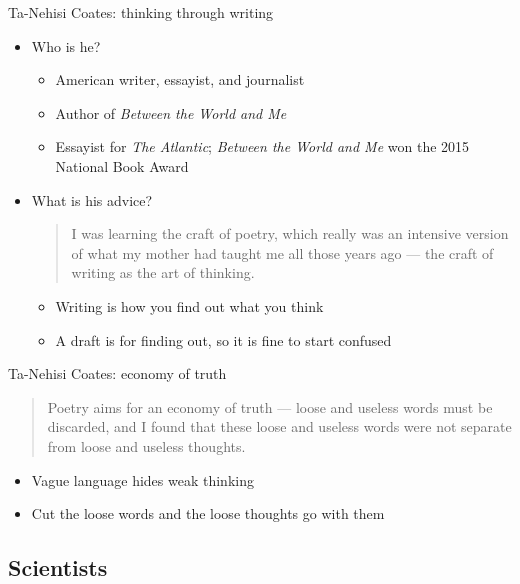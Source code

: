 \documentclass[aspectratio=169]{beamer}
\begin{document}
\begin{frame}{Ta-Nehisi Coates: thinking through writing}
  \begin{itemize}
  \item Who is he?
    \begin{itemize}
    \item American writer, essayist, and journalist
    \item Author of \emph{Between the World and Me}
    \item Essayist for \emph{The Atlantic}; \emph{Between the World and Me} won the 2015 National Book Award
     \end{itemize}
  \item What is his advice?
    \begin{quote}
      I was learning the craft of poetry, which really was an intensive
      version of what my mother had taught me all those years ago --- the
      craft of writing as the art of thinking.
      \hfill \textnormal{\citep[p.~51]{coates:between}}
    \end{quote}
    \begin{itemize}
    \item Writing is how you find out what you think
    \item A draft is for finding out, so it is fine to start confused
    \end{itemize}
\end{itemize}
\end{frame}

\begin{frame}{Ta-Nehisi Coates: economy of truth}
  \begin{quote}
    Poetry aims for an economy of truth --- loose and useless words must be
    discarded, and I found that these loose and useless words were not
    separate from loose and useless thoughts.
    \hfill \textnormal{\citep[p.~51]{coates:between}}
  \end{quote}
  \begin{itemize}
  \item Vague language hides weak thinking
  \item Cut the loose words and the loose thoughts go with them
  \end{itemize}
\end{frame}


\subsection{Scientists}
\end{document}
